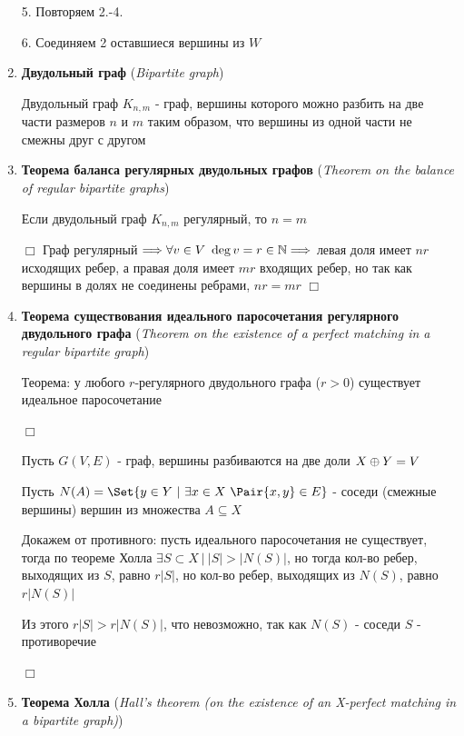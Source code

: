 \documentclass[12pt]{article}
\begin{document}
\begin{enumerate}
        5. Повторяем 2.-4.

        6. Соединяем 2 оставшиеся вершины из $W$


        \item \textbf{Двудольный граф} (\textit{Bipartite graph})

        Двудольный граф $K_{n,m}$ - граф, вершины которого можно разбить на две части размеров $n$ и $m$ таким образом, что вершины из одной части не смежны друг с другом

        \item \textbf{Теорема баланса регулярных двудольных графов} (\textit{Theorem on the balance of regular bipartite graphs})

        Если двудольный граф $K_{n,m}$ регулярный, то $n = m$

        $\Box$ Граф регулярный $\Longrightarrow \forall v \in V \ \deg v = r \in \mathbb{N} \Longrightarrow $ левая доля имеет $nr$ исходящих ребер, а правая доля имеет $mr$ входящих ребер, но так как вершины в долях не соединены ребрами, $nr = mr$ $\Box$

        \item \textbf{Теорема существования идеального паросочетания регулярного двудольного графа} (\textit{Theorem on the existence of a perfect matching in a regular bipartite graph})

        Теорема: у любого $r$-регулярного двудольного графа ($r > 0$) существует идеальное паросочетание

        $\Box$

        Пусть $G(V, E)$ - граф, вершины разбиваются на две доли $X \oplus Y = V$

        Пусть $N(A) = \Set{y \in Y \ | \ \exists x \in X \ \Pair{x, y} \in E}$ - соседи (смежные вершины) вершин из множества $A \subseteq X$

        Докажем от противного: пусть идеального паросочетания не существует, тогда по теореме Холла $\exists S \subset X \ | \ |S| > |N(S)|$,
        но тогда кол-во ребер, выходящих из $S$, равно $r|S|$, но кол-во ребер, выходящих из $N(S)$, равно $r|N(S)|$

        Из этого $r|S| > r|N(S)|$, что невозможно, так как $N(S)$ - соседи $S$ - противоречие

        $\Box$


        \item \textbf{Теорема Холла} (\textit{Hall's theorem (on the existence of an X-perfect matching in a bipartite graph)})


\end{enumerate}
\end{document}

